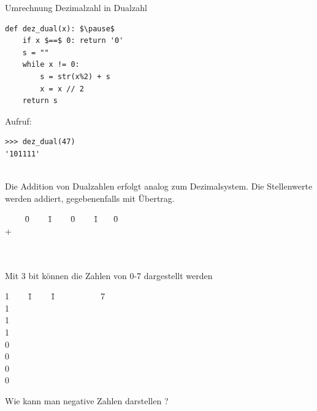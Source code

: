 \documentclass[10pt]{beamer}
\begin{document}
\begin{frame}[fragile]
Umrechnung Dezimalzahl in Dualzahl 
\begin{lstlisting}
def dez_dual(x): $\pause$
    if x $==$ 0: return '0'
    s = ""                 
    while x != 0:
        s = str(x%2) + s
        x = x // 2
    return s
\end{lstlisting}

Aufruf:
\begin{lstlisting}
>>> dez_dual(47)
'101111'    


\end{lstlisting} 
\end{frame}

\begin{frame}[fragile]
Die Addition von Dualzahlen erfolgt analog zum Dezimalsystem. Die Stellenwerte werden addiert, gegebenenfalls mit Übertrag.

\begin{tabbing}
 ~~~~ \= 0 ~~~ \= 1 ~~~ \= 0 ~~~ \= 1 ~~~\= 0 \\
+      \\
\\       \\
 \end{tabbing} 


\end{frame}


\begin{frame}[fragile]
Mit 3 bit können die Zahlen von 0-7 dargestellt werden
\begin{tabbing}
1 ~~~ \= 1 ~~~ \= 1 ~~~~~~~~~~\= 7 \\
1    \\
1    \\
1    \\
0    \\
0    \\
0    \\
0    
 \end{tabbing}  
Wie kann man negative Zahlen darstellen ?
\end{frame}
\end{document}
